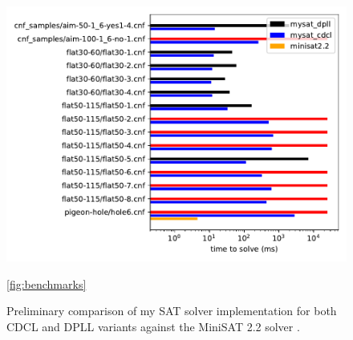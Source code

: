 \documentclass[12pt]{article}
\begin{document}
\begin{figure}
    \begin{center}
        \includegraphics[scale=0.6]{../results/compare.pdf}
    \end{center}
    \caption{Preliminary comparison of my SAT solver implementation for both CDCL and DPLL variants against the MiniSAT 2.2 solver \cite{minisat}. }
    \ref{fig:benchmarks}
\end{figure}


\end{document}
